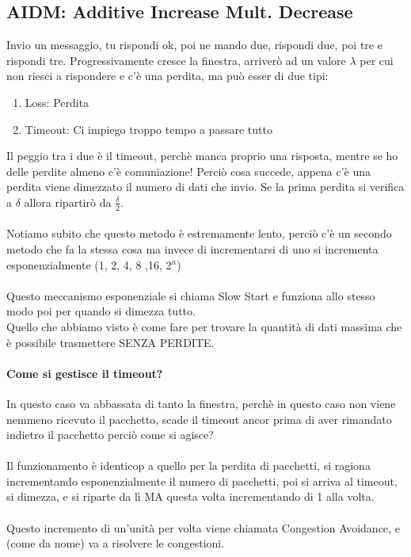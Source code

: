 \documentclass[12pt, a4paper, openany, twoside]{book}
\begin{document}
\subsection{AIDM: Additive Increase Mult. Decrease}
Invio un messaggio, tu rispondi ok, poi ne mando due, rispondi due, poi tre e 
rispondi tre. Progressivamente cresce la finestra, arriverò ad un valore $\lambda$
per cui non riesci a rispondere e c'è una perdita, ma può esser di due tipi:
\begin{enumerate}
	\item Loss: Perdita
	\item Timeout: Ci impiego troppo tempo a passare tutto
\end{enumerate}
Il peggio tra i due è il timeout, perchè manca proprio una risposta, mentre 
se ho delle perdite almeno c'è comuniazione! Perciò cosa succede, appena c'è una
perdita viene dimezzato il numero di dati che invio. Se la prima perdita si verifica
a $\delta$ allora ripartirò da $\frac{\delta}{2}$.
\\ \\
Notiamo subito che questo metodo è estremamente lento, perciò c'è un secondo 
metodo che fa la stessa cosa ma invece di incrementarsi di uno si incrementa 
esponenzialmente (1, 2, 4, 8 ,16, 2$^{n}$)
\\ \\
Questo meccanismo esponenziale si chiama Slow Start e funziona allo stesso modo
poi per quando si dimezza tutto.
\\
Quello che abbiamo visto è come fare per trovare la quantità di dati massima 
che è possibile trasmettere SENZA PERDITE.
\paragraph{Come si gestisce il timeout?} 
In questo caso va abbassata di tanto la finestra, perchè in questo caso non 
viene nemmeno ricevuto il pacchetto, scade il timeout ancor prima di aver 
rimandato indietro il pacchetto perciò come si agisce? \\ \\
Il funzionamento è identicop a quello per la perdita di pacchetti, si ragiona
incrementando esponenzialmente il numero di pacchetti, poi si arriva al timeout,
si dimezza, e si riparte da lì MA questa volta incrementando di 1 alla volta.
\\ \\
Questo incremento di un'unità per volta viene chiamata Congestion Avoidance, e
(come da nome) va a risolvere le congestioni.
\end{document}
